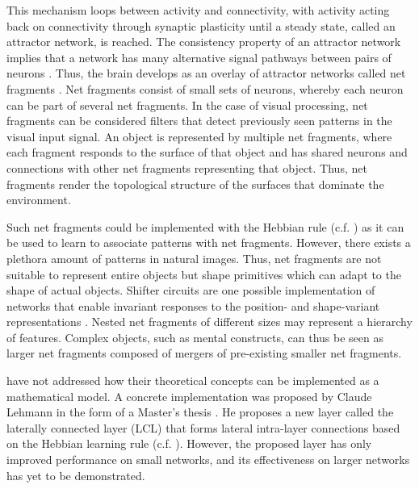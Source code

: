 This mechanism loops between activity and connectivity, with activity acting back on connectivity through synaptic plasticity until a steady state, called an attractor network, is reached.
The consistency property of an attractor network implies that a network has many alternative signal pathways between pairs of neurons .
Thus, the brain develops as an overlay of attractor networks called net fragments .
Net fragments consist of small sets of neurons, whereby each neuron can be part of several net fragments.
In the case of visual processing, net fragments can be considered filters that detect previously seen patterns in the visual input signal.
An object is represented by multiple net fragments, where each fragment responds to the surface of that object and has shared neurons and connections with other net fragments representing that object.
Thus, net fragments render the topological structure of the surfaces that dominate the environment.

Such net fragments could be implemented with the Hebbian rule (c.f. ) as it can be used to learn to associate patterns with net fragments. However, there exists a plethora amount of patterns in natural images. Thus, net fragments are not suitable to represent entire objects but shape primitives which can adapt to the shape of actual objects.
Shifter circuits are one possible implementation of networks that enable invariant responses to the position- and shape-variant representations .
Nested net fragments of different sizes may represent a hierarchy of features.
Complex objects, such as mental constructs, can thus be seen as larger net fragments composed of mergers of pre-existing smaller net fragments.

 have not addressed how their theoretical concepts can be implemented as a mathematical model.
A concrete implementation was proposed by Claude Lehmann in the form of a Master's thesis .
He proposes a new layer called the laterally connected layer (LCL) that forms lateral intra-layer connections based on the Hebbian learning rule (c.f. ).
However, the proposed layer has only improved performance on small networks, and its effectiveness on larger networks has yet to be demonstrated.

